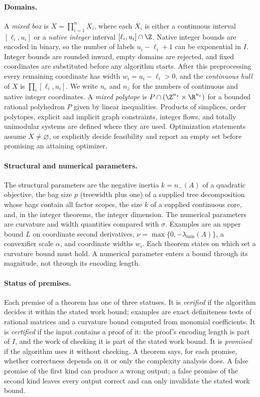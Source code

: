 \paragraph{Domains.}
A \emph{mixed box} is $X=\prod_{i=1}^nX_i$, where each $X_i$ is either a
continuous interval $[\ell_i,u_i]$ or a \emph{native integer} interval
$[\ell_i,u_i]\cap\Z$. Native integer bounds are encoded in binary, so the
number of labels $u_i-\ell_i+1$ can be exponential in $I$. Integer bounds
are rounded inward, empty domains are rejected, and fixed coordinates are
substituted before any algorithm starts. After this preprocessing every
remaining coordinate has width $w_i=u_i-\ell_i>0$, and the
\emph{continuous hull} of $X$ is $\prod_i[\ell_i,u_i]$. We write $n_c$ and
$n_z$ for the numbers of continuous and native integer coordinates. A
\emph{mixed polytope} is $P\cap(\Z^{n_z}\times\R^{n_c})$ for a bounded
rational polyhedron $P$ given by linear inequalities. Products of simplices,
order polytopes, explicit and implicit graph constraints, integer flows, and
totally unimodular systems are defined where they are used.
Optimization statements assume $X\ne\varnothing$, or explicitly decide
feasibility and report an empty set before promising an attaining optimizer.

\paragraph{Structural and numerical parameters.}
The structural parameters are the negative inertia $k=n_-(A)$ of a quadratic
objective, the bag size $p$ (treewidth plus one) of a supplied tree
decomposition whose bags contain all factor scopes, the size $k$ of a
supplied continuous core, and, in the integer theorems, the integer
dimension. The numerical parameters are curvature and width quantities
compared with $\sigma$. Examples are an upper bound $L$ on coordinate second
derivatives, $\nu=\max\{0,-\lambda_{\min}(A)\}$, a convexifier scale
$\alpha$, and coordinate widths $w_i$. Each theorem states on which set a
curvature bound must hold. A numerical parameter enters a bound through its
magnitude, not through its encoding length.

\paragraph{Status of premises.}
Each premise of a theorem has one of three statuses. It is \emph{verified}
if the algorithm decides it within the stated work bound; examples are exact
definiteness tests of rational matrices and a curvature bound computed from
monomial coefficients. It is \emph{certified} if the input contains a proof
of it: the proof's encoding length is part of $I$, and the work of checking
it is part of the stated work bound. It is \emph{promised} if the algorithm
uses it without checking. A theorem says, for each promise, whether
correctness depends on it or only the complexity analysis does. A false
promise of the first kind can produce a wrong output; a false promise of the
second kind leaves every output correct and can only invalidate the stated
work bound.

